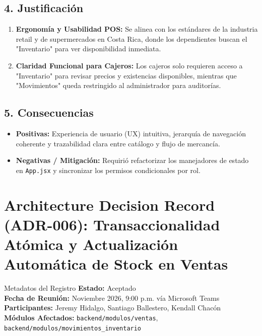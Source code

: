\documentclass[11pt,a4paper]{article}
\begin{document}
\subsection{4. Justificación}
\begin{enumerate}
    \item \textbf{Ergonomía y Usabilidad POS:} Se alinea con los estándares de la industria retail y de supermercados en Costa Rica, donde los dependientes buscan el "Inventario" para ver disponibilidad inmediata.
    \item \textbf{Claridad Funcional para Cajeros:} Los cajeros solo requieren acceso a "Inventario" para revisar precios y existencias disponibles, mientras que "Movimientos" queda restringido al administrador para auditorías.
\end{enumerate}

\subsection{5. Consecuencias}
\begin{itemize}[leftmargin=*]
    \item \textbf{Positivas:} Experiencia de usuario (UX) intuitiva, jerarquía de navegación coherente y trazabilidad clara entre catálogo y flujo de mercancía.
    \item \textbf{Negativas / Mitigación:} Requirió refactorizar los manejadores de estado en \texttt{App.jsx} y sincronizar los permisos condicionales por rol.
\end{itemize}

\newpage

\section{Architecture Decision Record (ADR-006): Transaccionalidad Atómica y Actualización Automática de Stock en Ventas}

\begin{adrbox}{Metadatos del Registro}
\textbf{Estado:} Aceptado \\
\textbf{Fecha de Reunión:} Noviembre 2026, 9:00 p.m. vía Microsoft Teams \\
\textbf{Participantes:} Jeremy Hidalgo, Santiago Ballestero, Kendall Chacón \\
\textbf{Módulos Afectados:} \texttt{backend/modulos/ventas}, \texttt{backend/modulos/movimientos\_inventario}
\end{adrbox}
\end{document}
